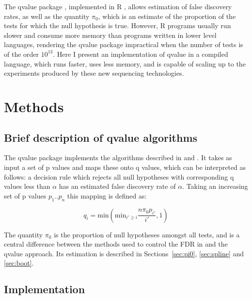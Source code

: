 \documentclass{amsart}
\begin{document}
The qvalue package \citep{qvalue}, implemented in R \citep{R}, allows estimation of false discovery rates, as well as the quantity $\pi_0$, which is an estimate of the proportion of the tests for which the null hypothesis is true. However, R programs usually run slower and consume more memory than programs written in lower level languages, rendering the qvalue package impractical when the number of tests is of the order $10^{13}$. Here I present an implementation of qvalue in a compiled language, which runs faster, uses less memory, and is capable of scaling up to the experiments produced by these new sequencing technologies.

\section{Methods}

\subsection{Brief description of qvalue algorithms}

The qvalue package implements the algorithms described in \citet{storeydirect, splinestorey} and \citet{bootstorey}. It takes as input a set of p values and maps these onto q values, which can be interpreted as follows: a decision rule which rejects all null hypotheses with corresponding q values less than $\alpha$ has an estimated false discovery rate of $\alpha$. Taking an increasing set of p values $p_1..p_n$ this mapping is defined as:

\begin{equation}
\label{eq:qvalue}
q_i = \text{min}(\text{min}_{i' \geq i} \frac{n \pi_0p_{i'}} {i'}, 1)
\end{equation}

The quantity $\pi_0$ is the proportion of null hypotheses amongst all tests, and is a central difference between the methods used to control the FDR in \citet{fdr} and the qvalue approach. Its estimation is described in Sections~\ref{sec:pi0}, \ref{sec:spline} and \ref{sec:boot}.

\subsection{Implementation}
\end{document}
